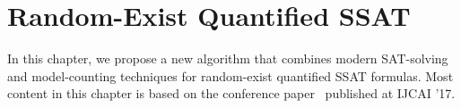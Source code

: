 \chapter{Random-Exist Quantified SSAT}
\label{chap:random-exist-ssat}

In this chapter, we propose a new algorithm that combines modern SAT-solving and model-counting techniques for random-exist quantified SSAT formulas.
Most content in this chapter is based on the conference paper~\cite{LeeIJCAI17RESSAT} published at IJCAI '17.



